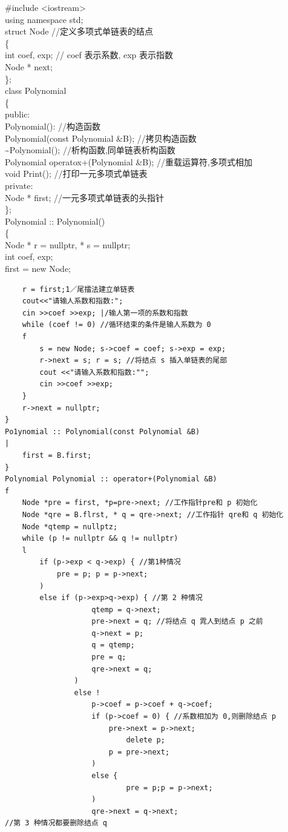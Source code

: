 \documentclass[10pt]{article}
\begin{document}
\#include <iostream>\\
using namespace std;\\
struct Node //定义多项式单链表的结点\\
\{\\
int coef, exp; // coef 表示系数, exp 表示指数\\
Node * next;\\
\};\\
class Polynomial\\
\{\\
public:\\
Polynomial(): //构造函数\\
Polynomial(const Polynomial \&B); //拷贝构造函数\\
\~{}Polynomial(); //析构函数,同单链表析构函数\\
Polynomial operatox+(Polynomial \&B); //重载运算符,多项式相加\\
void Print(); //打印一元多项式单链表\\
private:\\
Node * first; //一元多项式单链表的头指针\\
\};\\
Polynomial :: Polynomial()\\
\{\\
Node * r = nullptr, * s = nullptr;\\
int coef, exp;\\
first = new Node;

\begin{verbatim}
    r = first;1／尾擂法建立单链表
    cout<<"请输人系数和指数:";
    cin >>coef >>exp; |/输人第一项的系数和指数
    while (coef != 0) //循环结束的条件是输人系数为 0
    f
        s = new Node; s->coef = coef; s->exp = exp;
        r->next = s; r = s; //将结点 s 插入单链表的尾部
        cout <<"请输入系数和指数:"";
        cin >>coef >>exp;
    }
    r->next = nullptr;
}
Po1ynomial :: Polynomial(const Polynomial &B)
|
    first = B.first;
}
Polynomial Polynomial :: operator+(Polynomial &B)
f
    Node *pre = first, *p=pre->next; //工作指针pre和 p 初始化
    Node *qre = B.flrst, * q = qre->next; //工作指针 qre和 q 初始化
    Node *qtemp = nullptz;
    while (p != nullptr && q != nullptr)
    l
        if (p->exp < q->exp) { //第1种情况
            pre = p; p = p->next;
        )
        else if (p->exp>q->exp) { //第 2 种情况
                    qtemp = q->next;
                    pre->next = q; //将结点 q 雿人到结点 p 之前
                    q->next = p;
                    q = qtemp;
                    pre = q;
                    qre->next = q;
                )
                else !
                    p->coef = p->coef + q->coef;
                    if (p->coef = 0) { //系数相加为 0,则删除结点 p
                        pre->next = p->next;
                            delete p;
                        p = pre->next;
                    )
                    else {
                            pre = p;p = p->next;
                    )
                    qre->next = q->next;
//第 3 种情况都要删除结点 q
\end{verbatim}
\end{document}
